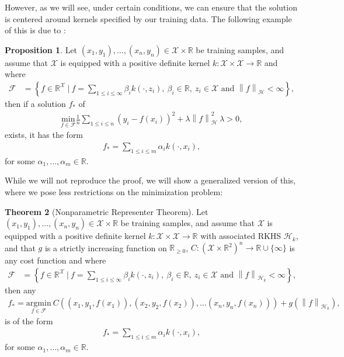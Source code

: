 \documentclass[10pt,twoside,openany,final]{memoir}
\theoremstyle{definition}
\newtheorem{theorem}{Theorem}[chapter]
\newtheorem{proposition}[theorem]{Proposition}
\theoremstyle{Break}
\newcommand{\lv}{\left\lVert}
\newcommand{\rv}{\right\rVert}
\newcommand{\R}{\mathbb{R}}
\newcommand{\F}{\mathcal{F}}
\renewcommand{\H}{\mathcal{H}}
\begin{document}
However, as we will see, under certain conditions, we can ensure that the solution is centered around kernels specified by our training data. The following example of this is due to \cite{no}:
\begin{proposition}
	Let $(x_1,y_1),\dots,(x_n,y_n) \in \mathcal{X}\times \R$ be training samples, and assume that $\mathcal{X}$ is equipped with a positive definite kernel $k \colon \mathcal{X} \times \mathcal{X} \to \R$ and where
	\begin{align*}
		\F &= \left\{ f \in \R^{\mathcal{X}}\ \big| \ f = \sum_{1 \leq i \leq \infty} \beta_i k(\cdot , z_i), \ \beta_i \in \R, \ z_i \in \mathcal{X} \text{ and } \lv f \rv_\H < \infty  \right\},
	\end{align*}
	then if a solution $f_*$ of
	\begin{align*}
		\underset{f \in \F}{\mathrm{min}} \frac1n \sum_{1 \leq i \leq n}(y_i - f(x_i))^2 + \lambda \lv f \rv_\H^2 \  \lambda > 0,
	\end{align*}
	exists, it has the form
	\begin{align*}
		f_*= \sum_{1 \leq i \leq m} \alpha_i k(\cdot , x_i),
	\end{align*}
	for some $\alpha_1,\dots,\alpha_m \in \R$.
\end{proposition}
While we will not reproduce the proof, we will show a generalized version of this, where we pose less restrictions on the minimization problem:
\begin{theorem}[Nonparametric Representer Theorem]
	Let $(x_1,y_1),\dots,(x_n,y_n) \in \mathcal{X}\times \R$ be training samples, and assume that $\mathcal{X}$ is equipped with a positive definite kernel $k \colon \mathcal{X} \times \mathcal{X} \to \R$ with associated RKHS $\H_k$, and that $g$ is a strictly  increasing function on $\R_{\geq 0}$, $C \colon (\mathcal{X}\times \R^2)^n \to \R\cup\{\infty\}$ is any cost function and where
	\begin{align*}
		\F &= \left\{ f \in \R^{\mathcal{X}}\ \big| \ f = \sum_{1 \leq i \leq \infty} \beta_i k(\cdot , z_i), \ \beta_i \in \R, \ z_i \in \mathcal{X} \text{ and } \lv f \rv_{\H_k} < \infty  \right\},
	\end{align*}
	then any
	\begin{align*}
		f_*=\underset{f \in \F}{\mathrm{argmin}} \ C\left( (x_1,y_1,f(x_1)),(x_2,y_2,f(x_2)),\dots(x_n,y_n,f(x_n)) \right) + g(\lv f \rv_{\H_k}),
	\end{align*}
	 is of the form
	\begin{align*}
		f_*= \sum_{1 \leq i \leq m} \alpha_i k(\cdot , x_i),
	\end{align*}
	for some $\alpha_1,\dots,\alpha_m \in \R$.
	\label{NPRT}
\end{theorem}
\end{document}

